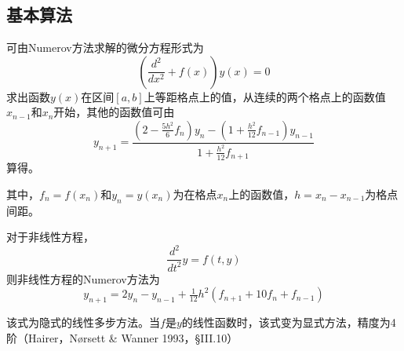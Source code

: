 \documentclass[twoside,twocolumn]{article}
\begin{document}
\begin{CJK*}{UTF8}{gkai}
\subsection{基本算法}
可由Numerov方法求解的微分方程形式为
\begin{equation*}
\left({\frac {d^{2}}{dx^{2}}}+f(x)\right)y(x)=0 
\end{equation*}
求出函数$y(x)$在区间$[a,b]$上等距格点上的值，从连续的两个格点上的函数值$x_{n-1}$和$x_{n}$开始，其他的函数值可由
\begin{equation*}
y_{n+1}={\frac {\left(2-{\frac {5h^{2}}{6}}f_{n}\right)y_{n}-\left(1+{\frac {h^{2}}{12}}f_{n-1}\right)y_{n-1}}{1+{\frac {h^{2}}{12}}f_{n+1}}}
\end{equation*}
算得。

其中，$f_{n}=f(x_{n})$和$y_{n}=y(x_{n})$为在格点$x_{n}$上的函数值，$h=x_{n}-x_{n-1}$为格点间距。

对于非线性方程，
\begin{equation*}
\frac{d^{2}}{dt^{2}}y=f(t,y)
\end{equation*}
则非线性方程的Numerov方法为
\begin{equation*}
y_{n+1}=2y_{n}-y_{n-1}+{\tfrac {1}{12}}h^{2}(f_{n+1}+10f_{n}+f_{n-1})
\end{equation*}

该式为隐式的线性多步方法。当$f$是$y$的线性函数时，该式变为显式方法，精度为4阶（Hairer，Nørsett \& Wanner 1993，§III.10）

\end{CJK*}
\end{document}
